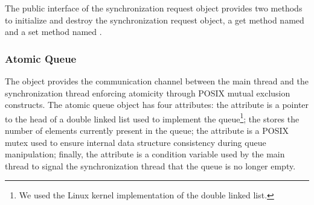 %
%
%

The public interface of the synchronization request object provides two methods to initialize and destroy the synchronization request object, a get method named  
and a set method named . 

\subsubsection{Atomic Queue}
The  object provides the communication channel between the main thread and the synchronization thread enforcing atomicity through POSIX mutual exclusion constructs.
The atomic queue object has four attributes: the  attribute is a pointer to the head of a double linked list used to implement the queue\footnote{We used the Linux kernel implementation
of the double linked list.}; the  stores the number of elements currently present in the queue; the  attribute is a POSIX mutex used to ensure internal data structure 
consistency during queue manipulation; finally, the  attribute is a condition variable used by the main thread to signal the synchronization thread that the queue is no longer empty. 

